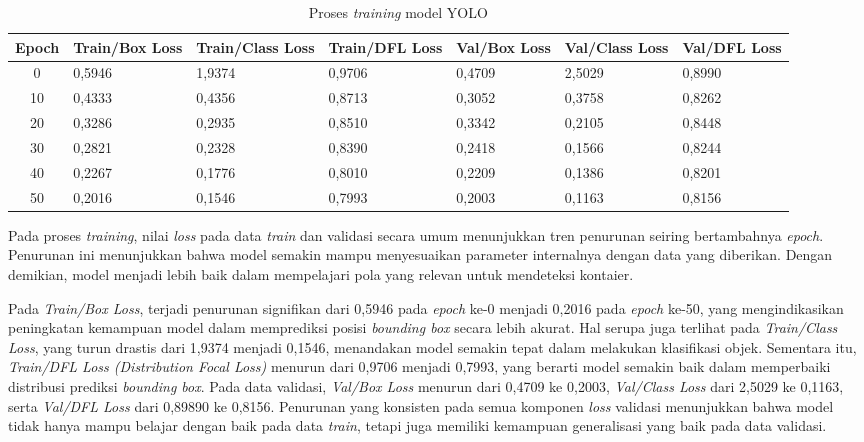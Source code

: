 \begin{table}[H]
  \caption{Proses \textit{training} model YOLO}
  \label{tab:yolo-train}
  \vspace{-1em}
  \centering
  \small
  \begin{tabular}{c p{1.5cm} p{1.5cm} p{1.5cm} p{1.5cm} p{1.5cm} p{1.5cm}}
    \toprule
    \textbf{Epoch} & \textbf{Train/Box Loss} & \textbf{Train/Class Loss}
    & \textbf{Train/DFL Loss} & \textbf{Val/Box Loss}
    & \textbf{Val/Class Loss} & \textbf{Val/DFL Loss} \\
    \midrule
    0  & 0,5946 & 1,9374 & 0,9706 & 0,4709 & 2,5029 & 0,8990 \\
    10 & 0,4333 & 0,4356 & 0,8713 & 0,3052 & 0,3758 & 0,8262 \\
    20 & 0,3286 & 0,2935 & 0,8510 & 0,3342 & 0,2105 & 0,8448 \\
    30 & 0,2821 & 0,2328 & 0,8390 & 0,2418 & 0,1566 & 0,8244 \\
    40 & 0,2267 & 0,1776 & 0,8010 & 0,2209 & 0,1386 & 0,8201 \\
    50 & 0,2016 & 0,1546 & 0,7993 & 0,2003 & 0,1163 & 0,8156 \\
    \bottomrule
  \end{tabular}
  \normalsize
\end{table}
Pada proses \textit{training}, nilai \textit{loss} pada data
\textit{train} dan validasi secara umum menunjukkan tren penurunan
seiring bertambahnya \textit{epoch}. Penurunan ini menunjukkan bahwa
model semakin mampu menyesuaikan parameter internalnya dengan data
yang diberikan. Dengan demikian, model menjadi lebih baik dalam
mempelajari pola yang relevan untuk mendeteksi kontaier.

Pada \textit{Train/Box Loss}, terjadi penurunan signifikan dari
0,5946 pada \textit{epoch} ke-0 menjadi 0,2016 pada \textit{epoch}
ke-50, yang mengindikasikan peningkatan kemampuan model dalam
memprediksi posisi \textit{bounding box} secara lebih akurat. Hal
serupa juga terlihat pada \textit{Train/Class Loss}, yang turun
drastis dari 1,9374 menjadi 0,1546, menandakan model semakin tepat
dalam melakukan klasifikasi objek. Sementara itu, \textit{Train/DFL
Loss (Distribution Focal Loss)} menurun dari 0,9706 menjadi 0,7993,
yang berarti model semakin baik dalam memperbaiki distribusi prediksi
\textit{bounding box}. Pada data validasi, \textit{Val/Box Loss}
menurun dari 0,4709 ke 0,2003, \textit{Val/Class Loss} dari 2,5029
ke 0,1163, serta \textit{Val/DFL Loss} dari 0,89890 ke 0,8156.
Penurunan yang konsisten pada semua komponen \textit{loss} validasi
menunjukkan bahwa model tidak hanya mampu belajar dengan baik pada
data \textit{train}, tetapi juga memiliki kemampuan generalisasi yang
baik pada data validasi.

